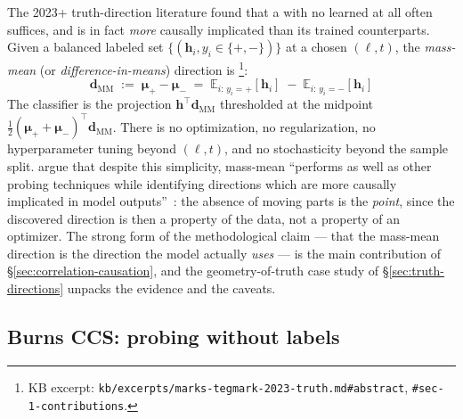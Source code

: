 The 2023+ truth-direction literature found that a  with no learned
 at all often suffices, and is in fact \emph{more} causally
implicated than its trained counterparts. Given a balanced labeled set
$\{(\mathbf{h}_i, y_i \in \{+, -\})\}$ at a chosen $(\ell, t)$, the
\emph{mass-mean} (or \emph{difference-in-means})  direction is
\citep{marks-tegmark-2023-truth}\footnote{KB excerpt:
\nolinkurl{kb/excerpts/marks-tegmark-2023-truth.md#abstract},
\texttt{\#sec-1-contributions}.}:
\begin{equation}
  \boxed{\;
  \mathbf{d}_{\mathrm{MM}}
  \;:=\; \boldsymbol{\mu}_+ - \boldsymbol{\mu}_-
  \;=\; \mathbb{E}_{i:\,y_i = +}[\mathbf{h}_i] \;-\; \mathbb{E}_{i:\,y_i = -}[\mathbf{h}_i]
  \;}
  \label{eq:mass-mean}
\end{equation}
The classifier is the projection $\mathbf{h}^\top \mathbf{d}_{\mathrm{MM}}$
thresholded at the midpoint
$\tfrac{1}{2}(\boldsymbol{\mu}_+ + \boldsymbol{\mu}_-)^\top
\mathbf{d}_{\mathrm{MM}}$. There is no optimization, no regularization,
no hyperparameter tuning beyond $(\ell, t)$, and no stochasticity beyond
the sample split. \citet{marks-tegmark-2023-truth} argue that despite
this simplicity, mass-mean ``performs as well as other probing techniques
while identifying directions which are more causally implicated in model
outputs''~\citep[abstract]{marks-tegmark-2023-truth}: the absence of
moving parts is the \emph{point}, since the discovered direction is then
a property of the data, not a property of an optimizer. The strong
form of the methodological claim — that the mass-mean direction is the
direction the model actually \emph{uses} — is the main
contribution of \S\ref{sec:correlation-causation}, and the geometry-of-truth
case study of \S\ref{sec:truth-directions} unpacks the evidence and the
caveats.

\subsection{Burns CCS: probing without labels}
\label{sec:ccs}

